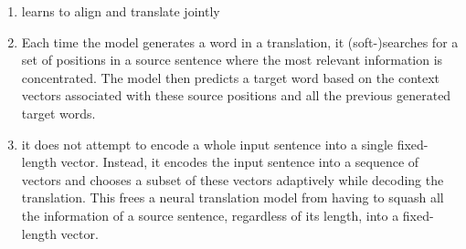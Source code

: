 \begin{enumerate}
    \item learns to align and translate jointly
    \hfill \cite{adv-ml-tech/paper/arxiv.org/1409.0473}

    \item Each time the model generates a word in a translation, it (soft-)searches for a set of positions in a source sentence where the most relevant information is concentrated.
    The model then predicts a target word based on the context vectors associated with these source positions and all the previous generated target words.
    \hfill \cite{adv-ml-tech/paper/arxiv.org/1409.0473}

    \item it does not attempt to encode a whole input sentence into a single fixed-length vector.
    Instead, it encodes the input sentence into a sequence of vectors and chooses a subset of these vectors adaptively while decoding the translation.
    This frees a neural translation model from having to squash all the information of a source sentence, regardless of its length, into a fixed-length vector.
    \hfill \cite{adv-ml-tech/paper/arxiv.org/1409.0473}
\end{enumerate}











